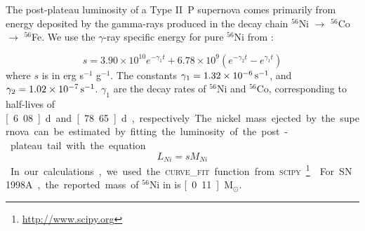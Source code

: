 \documentclass[apj]{emulateapj}
\begin{document}
The post-plateau luminosity of a Type II~P supernova comes primarily from energy deposited by the gamma-rays produced in the decay chain $^{56}$Ni $\rightarrow$ $^{56}$Co $\rightarrow$ $^{56}$Fe.
We use the $\gamma$-ray specific energy for pure $^{56}$Ni from \cite{sutherland_models_1984}:

\begin{equation}
    s = 3.90 \times 10^{10} e^{-\gamma_1 t} + 6.78 \times 10^{9} \left( e^{-\gamma_2 t} - e^{\gamma_1 t} \right)
\end{equation}
where $s$ is in erg s$^{-1}$ g$^{-1}$. The constants $\gamma_1 = \unit[1.32\times10^{-6}]{s^{-1}}$, and $\gamma_2 = \unit[1.02\times10^{-7}]{s^{-1}}$. $\gamma_1$ are the decay rates of $^{56}$Ni and $^{56}$Co, corresponding to half-lives of \unit[6.08]{d} and \unit[78.65]{d}, respectively.

The nickel mass ejected by the supernova can be estimated by fitting the luminosity of the post-plateau tail with the equation

\begin{equation}
    L_{Ni} = sM_{Ni}
\end{equation}
In our calculations, we used the \textsc{curve\_fit} function from \textsc{scipy}\footnote{\url{http://www.scipy.org}} \citep{jones_scipy:_2001}

For SN 1998A, the reported mass of $^{56}$Ni in \cite{pastorello_sn_2005} is \unit[0.11]{M$_{\odot}$}.



\end{document}
